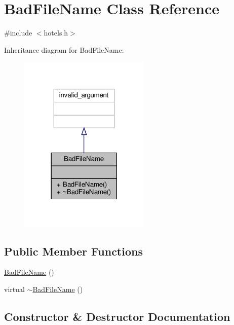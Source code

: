 \hypertarget{class_bad_file_name}{}\section{Bad\+File\+Name Class Reference}
\label{class_bad_file_name}


{\ttfamily \#include $<$hotels.\+h$>$}



Inheritance diagram for Bad\+File\+Name\+:\nopagebreak
\begin{figure}[H]
\begin{center}
\leavevmode
\includegraphics[width=177pt]{class_bad_file_name__inherit__graph}
\end{center}
\end{figure}
\subsection*{Public Member Functions}
\begin{DoxyCompactItemize}
\item 
\hyperlink{class_bad_file_name_adc47fdc3b0868830a1062fbc080fd735}{Bad\+File\+Name} ()
\item 
virtual \hyperlink{class_bad_file_name_a4ac0074ff0e544a3ffc6a18c8bdc1273}{$\sim$\+Bad\+File\+Name} ()
\end{DoxyCompactItemize}


\subsection{Constructor \& Destructor Documentation}
\mbox{\label{class_bad_file_name_adc47fdc3b0868830a1062fbc080fd735}} 
